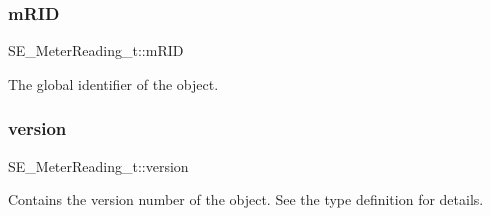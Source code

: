 \subsubsection{\texorpdfstring{m\+R\+ID}{mRID}}
{\footnotesize\ttfamily S\+E\+\_\+\+Meter\+Reading\+\_\+t\+::m\+R\+ID}

The global identifier of the object. \mbox{\label{group__MeterReading_ga5c1340f98b639840610b8b0ec3fd0eaa}} 
\subsubsection{\texorpdfstring{version}{version}}
{\footnotesize\ttfamily S\+E\+\_\+\+Meter\+Reading\+\_\+t\+::version}

Contains the version number of the object. See the type definition for details. 